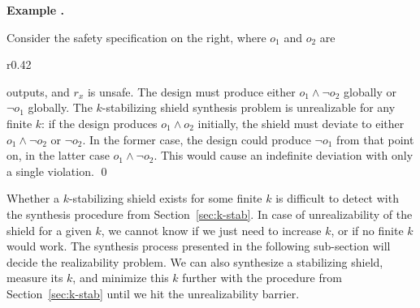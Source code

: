 \documentclass{llncs}
\newcounter{exacounter}
\newenvironment{exa}{
\refstepcounter{exacounter}
\smallskip\noindent
\textbf{Example \theexacounter.}
}{\vspace{2mm}}
\newcommand{\nd}{3cm} \tikzset{initial text={}}
\begin{document}
\begin{exa}
Consider the safety specification on the right, where $o_1$ and $o_2$ 
are 
\begin{wrapfigure}[6]{r}{0.42\textwidth}
\vspace{-1.0cm}
%
 \end{wrapfigure}
outputs, and $r_x$ is unsafe.  The design must produce either $o_1 
\wedge \neg o_2$ globally or $\neg o_1$ globally.  The $k$-stabilizing 
shield synthesis problem is unrealizable for any finite $k$: if the 
design produces $o_1 \wedge o_2$ initially, the shield must deviate to 
either $o_1 \wedge \neg o_2$ or $\neg o_2$.  In the former case, the 
design could produce $\neg o_1$ from that point on, in the latter case 
$o_1 \wedge \neg o_2$.  This would cause an indefinite deviation with 
only a single violation.  \qed

\end{exa}

Whether a $k$-stabilizing shield exists for some finite $k$ is difficult 
to detect with the synthesis procedure from Section~\ref{sec:k-stab}.  
In case of unrealizability of the shield for a given $k$, we cannot know 
if we just need to increase $k$, or if no finite $k$ would work.  The 
synthesis process presented in the following sub-section will decide the 
realizability problem.  We can also synthesize a stabilizing shield, 
measure its $k$, and minimize this $k$ further with the procedure from 
Section~\ref{sec:k-stab} until we hit the unrealizability barrier.
\end{document}
